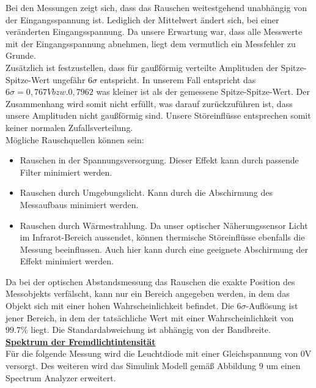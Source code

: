 \documentclass[a4paper,12pt]{article}
\begin{document}
	Bei den Messungen zeigt sich, dass das Rauschen weitestgehend unabhängig von der Eingangsspannung ist. Lediglich der Mittelwert ändert sich, bei einer veränderten Eingangsspannung.\newline
	Da unsere Erwartung war, dass alle Messwerte mit der Eingangsspannung abnehmen, liegt dem vermutlich ein Messfehler zu Grunde.\\ \newline
	Zusätzlich ist festzustellen, dass für gaußförmig verteilte Amplituden der Spitze-Spitze-Wert ungefähr $6\sigma$ entspricht. In unserem Fall entspricht das \(6\sigma = 0,767V bzw. 0,7962\) was kleiner ist als der gemessene Spitze-Spitze-Wert. Der Zusammenhang wird somit nicht erfüllt, was darauf zurückzuführen ist, dass unsere Amplituden nicht gaußförmig sind. Unsere Störeinflüsse entsprechen somit keiner normalen Zufallsverteilung.\\ \newline
	Mögliche Rauschquellen können sein:
	\begin{itemize}
		\item Rauschen in der Spannungsversorgung. Dieser Effekt kann durch passende Filter minimiert werden.
		\item Rauschen durch Umgebungslicht. Kann durch die Abschirmung des Messaufbaus minimiert werden.
		\item Rauschen durch Wärmestrahlung. Da unser optischer Näherungssensor Licht im Infrarot-Bereich aussendet, können thermische Störeinflüsse ebenfalls die Messung beeinflussen. Auch hier kann durch eine geeignete Abschirmung der Effekt minimiert werden.
	\end{itemize}
	Da bei der optischen Abstandsmessung das Rauschen die exakte Position des Messobjekts verfälscht, kann nur ein Bereich angegeben werden, in dem das Objekt sich mit einer hohen Wahrscheinlichkeit befindet.\newline
	Die $6\sigma$-Auflösung ist jener Bereich, in dem der tatsächliche Wert mit einer Wahrscheinlichkeit von $99.7\%$ liegt.\newline
	Die Standardabweichung ist abhängig von der Bandbreite.\\ \newline
	\noindent
	\underline{\textbf{Spektrum der Fremdlichtintensität}} \\ \newline
	Für die folgende Messung wird die Leuchtdiode mit einer Gleichspannung von 0V versorgt. Des weiteren wird das Simulink Modell gemäß Abbildung 9 um einen Spectrum Analyzer erweitert.\\
\end{document}
